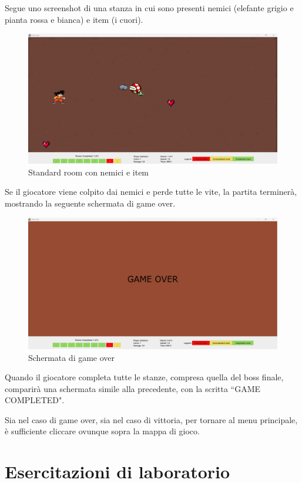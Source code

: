 \documentclass[a4paper,12pt]{report}
\begin{document}
\newpage
Segue uno screenshot di una stanza in cui sono presenti nemici
(elefante grigio e pianta rossa e bianca) e item (i cuori).
\begin{figure}[h]
\centering{}
\includegraphics[width=\textwidth]{img/standardRoom.png}
\caption{Standard room con nemici e item}
\label{img/standardRoom}
\end{figure}

Se il giocatore viene colpito dai nemici e perde tutte le vite, la partita terminerà, mostrando la seguente schermata di game over.
\begin{figure}[H]
\centering{}
\includegraphics[width=\textwidth]{img/gameOver.png}
\caption{Schermata di game over}
\label{img/gameover}
\end{figure}

Quando il giocatore completa tutte le stanze, compresa quella del boss finale, comparirà una
schermata simile alla precedente, con la scritta ``GAME COMPLETED".

Sia nel caso di game over, sia nel caso di vittoria, per tornare al menu principale, è sufficiente cliccare
ovunque sopra la mappa di gioco.


\chapter{Esercitazioni di laboratorio}
\end{document}
